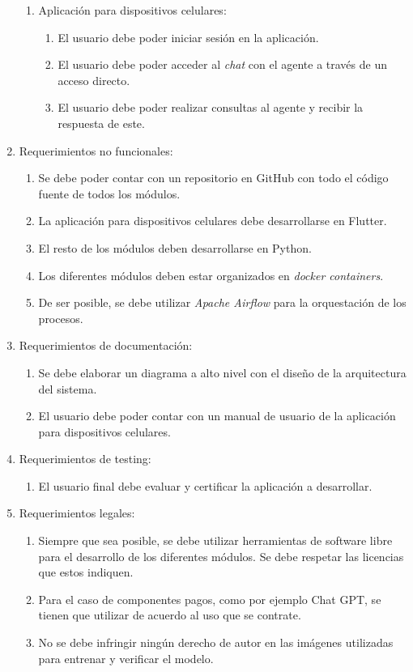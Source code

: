 \documentclass[
11pt, %
]{charter}
\begin{document}
\begin{enumerate}
\begin{enumerate}
		\item Aplicación para dispositivos celulares:
		\begin{enumerate}
			\item El usuario debe poder iniciar sesión en la aplicación.
			\item El usuario debe poder acceder al \textit{chat} con el agente a través de un acceso directo.
			\item El usuario debe poder realizar consultas al agente y recibir la respuesta de este.
		\end{enumerate}
	\end{enumerate}
	\item Requerimientos no funcionales:
		\begin{enumerate}
			\item Se debe poder contar con un repositorio en GitHub con todo el código fuente de todos los módulos.
			\item La aplicación para dispositivos celulares debe desarrollarse en Flutter.
			\item El resto de los módulos deben desarrollarse en Python.
			\item Los diferentes módulos deben estar organizados en \textit{docker containers}.
			\item De ser posible, se debe utilizar \textit{Apache Airflow} para la orquestación de los procesos.
		\end{enumerate}
	\item Requerimientos de documentación:
		\begin{enumerate}
			\item Se debe elaborar un diagrama a alto nivel con el diseño de la arquitectura del sistema.
			\item El usuario debe poder contar con un manual de usuario de la aplicación para dispositivos celulares.
		\end{enumerate}
	\item Requerimientos de testing:
		\begin{enumerate}
			\item El usuario final debe evaluar y certificar la aplicación a desarrollar.
		\end{enumerate}
	\item Requerimientos legales:
		\begin{enumerate}
			\item Siempre que sea posible, se debe utilizar herramientas de software libre para el desarrollo de los diferentes módulos. Se debe respetar las licencias que estos indiquen.
			\item Para el caso de componentes pagos, como por ejemplo Chat GPT, se tienen que utilizar de acuerdo al uso que se contrate.
			\item No se debe infringir ningún derecho de autor en las imágenes utilizadas para entrenar y verificar el modelo.
		\end{enumerate}
\end{enumerate}
\end{document}
